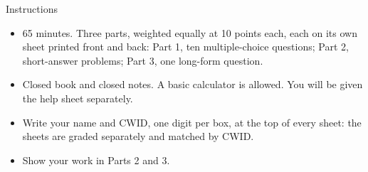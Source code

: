
\ifsolutions
{}
\else
{}
\begin{notepanel}{Instructions}
\begin{itemize}
\item 65 minutes. Three parts, weighted equally at 10 points each, each on its own sheet printed front and back: Part 1, ten multiple-choice questions; Part 2, short-answer problems; Part 3, one long-form question.
\item Closed book and closed notes. A basic calculator is allowed. You will be given the help sheet separately.
\item Write your name and CWID, one digit per box, at the top of every sheet: the sheets are graded separately and matched by CWID.
\item Show your work in Parts 2 and 3.
\end{itemize}
\end{notepanel}
\fi

